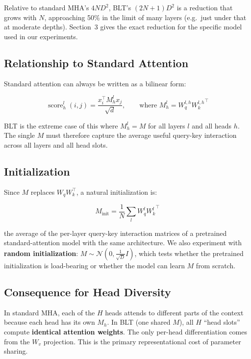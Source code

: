\documentclass[11pt]{article}
\begin{document}
Relative to standard MHA's $4ND^2$, BLT's $(2N+1)D^2$ is a reduction that grows with $N$, approaching 50\% in the limit of many layers (e.g.\ just under that at moderate depths). Section~3 gives the exact reduction for the specific model used in our experiments.

\subsection{Relationship to Standard Attention}

Standard attention can always be written as a bilinear form:

\begin{equation*}
\operatorname{score}_h^l(i,j) = \frac{x_i^\top M_h^l x_j}{\sqrt{d}}, \qquad \text{where } M_h^l = W_q^{l,h} {W_k^{l,h}}^\top
\end{equation*}

BLT is the extreme case of this where $M_h^l = M$ for all layers $l$ and all heads $h$. The single $M$ must therefore capture the average useful query-key interaction across all layers and all head slots.

\subsection{Initialization}

Since $M$ replaces $W_q W_k^\top$, a natural initialization is:

\begin{equation*}
M_{\text{init}} = \frac{1}{N}\sum_{l} W_q^l {W_k^l}^\top
\end{equation*}

the average of the per-layer query-key interaction matrices of a pretrained standard-attention model with the same architecture. We also experiment with \textbf{random initialization}: $M \sim \mathcal{N}\!\left(0, \tfrac{1}{\sqrt{D}} I\right)$, which tests whether the pretrained initialization is load-bearing or whether the model can learn $M$ from scratch.

\subsection{Consequence for Head Diversity}

In standard MHA, each of the $H$ heads attends to different parts of the context because each head has its own $M_h$. In BLT (one shared $M$), all $H$ ``head slots'' compute \textbf{identical attention weights}. The only per-head differentiation comes from the $W_v$ projection. This is the primary representational cost of parameter sharing.
\end{document}
